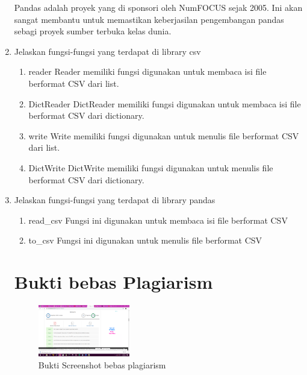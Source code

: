 \begin{enumerate}
\hfill\break
Pandas adalah proyek yang di sponsori oleh NumFOCUS sejak 2005. Ini akan sangat membantu untuk memastikan keberjasilan pengembangan pandas sebagi proyek sumber terbuka kelas dunia.
\item Jelaskan fungsi-fungsi yang terdapat di library csv
\begin{enumerate}
\item reader
\hfill\break
	Reader memiliki fungsi digunakan untuk membaca isi file berformat CSV dari list.
	
\item DictReader
\hfill\break
	DictReader memiliki fungsi digunakan untuk membaca isi file berformat CSV dari dictionary.
	
\item write
\hfill\break
	Write memiliki fungsi digunakan untuk menulis file berformat CSV dari list.
	
\item DictWrite
\hfill\break
	DictWrite memiliki fungsi digunakan untuk menulis file berformat CSV dari dictionary.
	
\end{enumerate}
\item Jelaskan fungsi-fungsi yang terdapat di library pandas
\begin{enumerate}
\item read\_csv
\hfill\break
	Fungsi ini digunakan untuk membaca isi file berformat CSV
	
\item to\_csv
\hfill\break
	Fungsi ini digunakan untuk menulis file berformat CSV
	
\end{enumerate}
\section{Bukti bebas Plagiarism}
\begin{figure}[H]
			\includegraphics[width=4cm]{figures/1184065/ss1.png}
			\centering
			\caption{Bukti Screenshot bebas plagiarism}
	\end{figure}

\end{enumerate}
